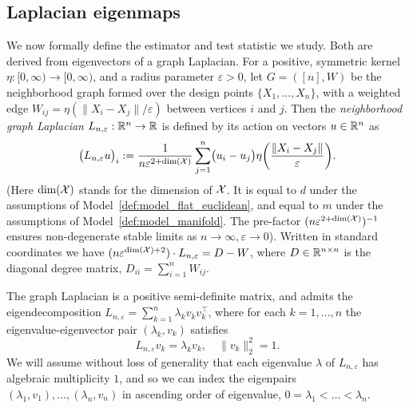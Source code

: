 \subsection{Laplacian eigenmaps}
\label{subsec:laplacian_eigenmaps}
We now formally define the estimator and test statistic we study. Both are derived from eigenvectors of a graph Laplacian.  For a positive, symmetric kernel $\eta: [0,\infty) \to [0,\infty)$, and a radius parameter $\varepsilon > 0$, let $G = ([n],W)$ be the neighborhood graph formed over the design points $\{X_1,\ldots,X_n\}$, with a weighted edge $W_{ij} = \eta(\|X_i - X_j\|/\varepsilon)$ between vertices $i$ and $j$. Then the 
\emph{neighborhood graph Laplacian} $L_{n,\varepsilon}: \mathbb{R}^n \to \mathbb{R}$ is defined by its action on vectors $u \in \mathbb{R}^n$ as
\begin{equation}
\label{eqn:neighborhood_graph_laplacian}
\bigl(L_{n,\varepsilon}u\bigr)_i := \frac{1}{n\varepsilon^{2 + \mathrm{dim}(\mathcal{X})}} \sum_{j = 1}^{n} \bigl(u_i - u_j\bigr) \eta\biggl(\frac{\|X_i - X_j\|}{\varepsilon}\biggr).
\end{equation}
(Here $\mathrm{dim}(\mathcal{X})$ stands for the dimension of $\mathcal{X}$. It is equal to $d$ under the assumptions of Model~\ref{def:model_flat_euclidean}, and equal to $m$ under the assumptions of Model~\ref{def:model_manifold}. The pre-factor $(n\varepsilon^{2 + \mathrm{dim}(\mathcal{X})})^{-1}$ ensures non-degenerate stable limits as $n \to \infty, \varepsilon \to 0$). Written in standard coordinates we have $(n\varepsilon^{\dim(\mathcal{X}) + 2}) \cdot L_{n,\varepsilon} = D - W$, where $D \in \mathbb{R}^{n \times n}$ is the diagonal degree matrix, $D_{ii} = \sum_{i = 1}^{n} W_{ij}$.

The graph Laplacian is a positive semi-definite matrix, and admits the eigendecomposition $L_{n,\varepsilon} = \sum_{k = 1}^{n} \lambda_k v_k v_k^{\top}$, where for each $k = 1,\ldots,n$ the eigenvalue-eigenvector pair $(\lambda_k,v_k)$ satisfies
\begin{equation*}
L_{n,\varepsilon}v_k = \lambda_k v_k, \quad \|v_k\|_2^2 = 1.
\end{equation*}
We will assume without loss of generality that each eigenvalue $\lambda$ of $L_{n,\varepsilon}$ has algebraic multiplicity $1$, and so we can index the eigenpairs $(\lambda_1,v_1),\ldots,(\lambda_n,v_n)$ in ascending order of eigenvalue, $0 = \lambda_1 < \ldots < \lambda_n$. 

